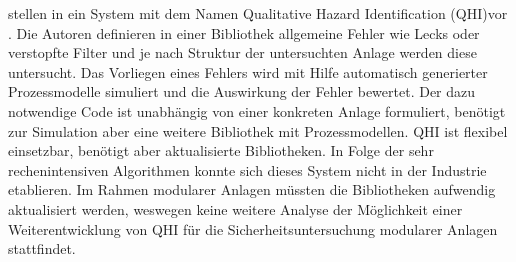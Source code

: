 \citeauthor{Catino_1995} stellen in  ein System mit dem Namen \glqq Qualitative Hazard Identification (QHI)\grqq { }vor \cite{Catino_1995}. Die Autoren definieren in einer Bibliothek allgemeine Fehler wie Lecks oder verstopfte Filter und je nach Struktur der untersuchten Anlage werden diese untersucht. Das Vorliegen eines Fehlers wird mit Hilfe automatisch generierter Prozessmodelle simuliert und die Auswirkung der Fehler bewertet. Der dazu notwendige Code ist unabh\"angig von einer konkreten Anlage formuliert, ben\"otigt zur Simulation aber eine weitere Bibliothek mit Prozessmodellen. QHI ist flexibel einsetzbar, ben\"otigt aber aktualisierte Bibliotheken. In Folge der sehr rechenintensiven Algorithmen konnte sich dieses System nicht in der Industrie etablieren. Im Rahmen modularer Anlagen m\"ussten die Bibliotheken aufwendig aktualisiert werden, weswegen keine weitere Analyse der M\"oglichkeit einer Weiterentwicklung von QHI f\"ur die Sicherheitsuntersuchung modularer Anlagen stattfindet. 

